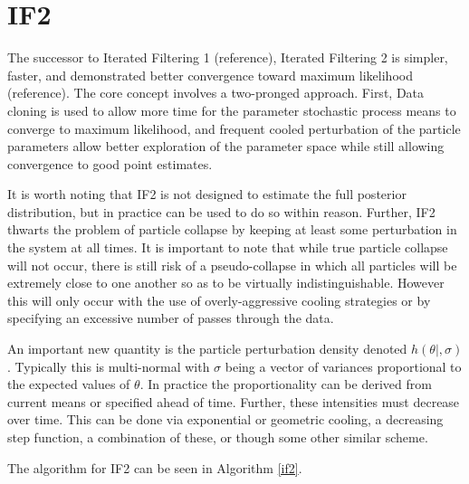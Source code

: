 \section{IF2}

	The successor to Iterated Filtering 1 (reference), Iterated Filtering 2 is simpler, faster, and demonstrated better convergence toward maximum likelihood (reference). The core concept involves a two-pronged approach. First, Data cloning is used to allow more time for the parameter stochastic process means to converge to maximum likelihood, and frequent cooled perturbation of the particle parameters allow better exploration of the parameter space while still allowing convergence to good point estimates.

	It is worth noting that IF2 is not designed to estimate the full posterior distribution, but in practice can be used to do so within reason. Further, IF2 thwarts the problem of particle collapse by keeping at least some perturbation in the system at all times. It is important to note that while true particle collapse will not occur, there is still risk of a pseudo-collapse in which all particles will be extremely close to one another so as to be virtually indistinguishable. However this will only occur with the use of overly-aggressive cooling strategies or by specifying an excessive number of passes through the data.

	An important new quantity is the particle perturbation density denoted $h(\theta|,\sigma)$. Typically this is multi-normal with $\sigma$ being a vector of variances proportional to the expected values of $\theta$. In practice the proportionality can be derived from current means or specified ahead of time. Further, these intensities must decrease over time. This can be done via exponential or geometric cooling, a decreasing step function, a combination of these, or though some other similar scheme.

	The algorithm for IF2 can be seen in Algorithm \ref{if2}.\\

